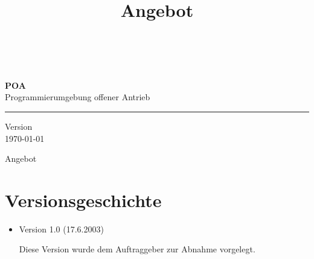 \documentclass[a4paper,titlepage,12pt,ngerman]{scrbook}
\title {\huge \product\\[0.5cm]\large Angebot\\[0.5cm] \version
  \\[1cm] \Large \company}
\newcommand\version{Version \RCSRevision \xspace}
\begin{document}

\begin{titlepage}

\renewcommand{\thefootnote}{\fnsymbol{footnote}}
{\Huge
\raggedright
\textbf{POA} \\
\huge Programmierumgebung offener Antrieb
\rule{\textwidth}{0.75pt}
\par
}
\begin{flushleft}
\normalsize
\version \\[2ex]
\today \\
\end{flushleft}
\vfill

{\parindent=0cm
\Huge Angebot
}


\setcounter{footnote}{0}
\end{titlepage}


\section*{Versionsgeschichte}

\begin{itemize}

\item Version 1.0 (17.6.2003)

  Diese Version wurde dem Auftraggeber zur Abnahme vorgelegt.

\end{itemize}


\tableofcontents














\appendix


\end{document}
